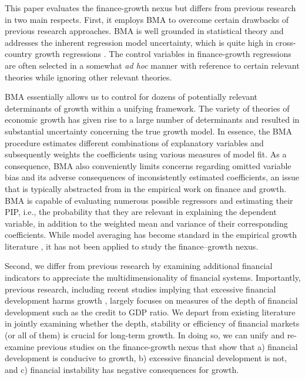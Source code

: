 This paper evaluates the finance-growth nexus but differs from previous research in two main respects. First, it employs \ac{BMA} to overcome certain drawbacks of previous research approaches. \ac{BMA} is well grounded in statistical theory \citep{Rafteryetal1997} and addresses the inherent regression model uncertainty, which is quite high in cross-country growth regressions \citep{Fernandezetal2001, SalaiMartinetal2004, Durlaufetal2008}. The control variables in finance-growth regressions are often selected in a somewhat \textit{ad hoc} manner with reference to certain relevant theories while ignoring other relevant theories. 

\ac{BMA} essentially allows us to control for dozens of potentially relevant determinants of growth within a unifying framework. The variety of theories of economic growth has given rise to a large number of determinants and resulted in substantial uncertainty concerning the true growth model. In essence, the \ac{BMA} procedure estimates different combinations of explanatory variables and subsequently weights the coefficients using various measures of model fit. As a consequence, \ac{BMA} also conveniently limits concerns regarding omitted variable bias and its adverse consequences of inconsistently estimated coefficients, an issue that is typically abstracted from in the empirical work on finance and growth. \ac{BMA} is capable of evaluating numerous possible regressors and estimating their \ac{PIP}, i.e., the probability that they are relevant in explaining the dependent variable, in addition to the weighted mean and variance of their corresponding coefficients. While model averaging has become standard in the empirical growth literature \citep{SalaiMartinetal2004, Durlaufetal2008}, it has not been applied to study the finance--growth nexus.  

Second, we differ from previous research by examining additional financial indicators to appreciate the multidimensionality of financial systems. Importantly, previous research, including recent studies implying that excessive financial development harms growth \citep{Arcandetal2012,CecchettiKharroubi2012,LawSingh2014}, largely focuses on measures of the depth of financial development such as the credit to GDP ratio. We depart from existing literature in jointly examining whether the depth, stability or efficiency of financial markets (or all of them) is crucial for long-term growth. In doing so, we can unify and re-examine previous studies on the finance-growth nexus that show that a) financial development is conducive to growth, b) excessive financial development is not, and c) financial instability has negative consequences for growth.

